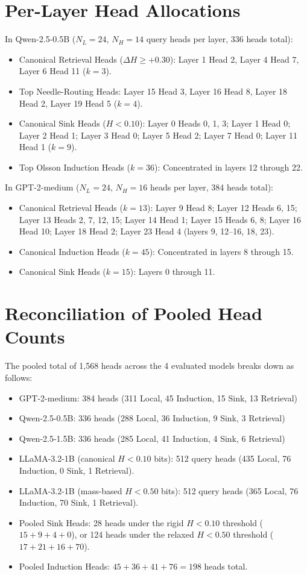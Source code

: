\documentclass[11pt]{article}
\begin{document}
\section{Per-Layer Head Allocations}
\label{sec:app_heads}
In Qwen-2.5-0.5B ($N_L = 24$, $N_H = 14$ query heads per layer, 336 heads total):
\begin{itemize}
    \setlength{\itemsep}{1pt}
    \item Canonical Retrieval Heads ($\Delta H \ge +0.30$): Layer 1 Head 2, Layer 4 Head 7, Layer 6 Head 11 ($k=3$).
    \item Top Needle-Routing Heads: Layer 15 Head 3, Layer 16 Head 8, Layer 18 Head 2, Layer 19 Head 5 ($k=4$).
    \item Canonical Sink Heads ($H < 0.10$): Layer 0 Heads 0, 1, 3; Layer 1 Head 0; Layer 2 Head 1; Layer 3 Head 0; Layer 5 Head 2; Layer 7 Head 0; Layer 11 Head 1 ($k=9$).
    \item Top Olsson Induction Heads ($k=36$): Concentrated in layers 12 through 22.
\end{itemize}
In GPT-2-medium ($N_L = 24$, $N_H = 16$ heads per layer, 384 heads total):
\begin{itemize}
    \setlength{\itemsep}{1pt}
    \item Canonical Retrieval Heads ($k=13$): Layer 9 Head 8; Layer 12 Heads 6, 15; Layer 13 Heads 2, 7, 12, 15; Layer 14 Head 1; Layer 15 Heads 6, 8; Layer 16 Head 10; Layer 18 Head 2; Layer 23 Head 4 (layers 9, 12--16, 18, 23).
    \item Canonical Induction Heads ($k=45$): Concentrated in layers 8 through 15.
    \item Canonical Sink Heads ($k=15$): Layers 0 through 11.
\end{itemize}

\section{Reconciliation of Pooled Head Counts}
\label{sec:app_counts}
The pooled total of 1,568 heads across the 4 evaluated models breaks down as follows:
\begin{itemize}
    \setlength{\itemsep}{1pt}
    \item GPT-2-medium: 384 heads (311 Local, 45 Induction, 15 Sink, 13 Retrieval)
    \item Qwen-2.5-0.5B: 336 heads (288 Local, 36 Induction, 9 Sink, 3 Retrieval)
    \item Qwen-2.5-1.5B: 336 heads (285 Local, 41 Induction, 4 Sink, 6 Retrieval)
    \item LLaMA-3.2-1B (canonical $H < 0.10$ bits): 512 query heads (435 Local, 76 Induction, 0 Sink, 1 Retrieval).
    \item LLaMA-3.2-1B (mass-based $H < 0.50$ bits): 512 query heads (365 Local, 76 Induction, 70 Sink, 1 Retrieval).
    \item Pooled Sink Heads: 28 heads under the rigid $H < 0.10$ threshold ($15 + 9 + 4 + 0$), or 124 heads under the relaxed $H < 0.50$ threshold ($17 + 21 + 16 + 70$).
    \item Pooled Induction Heads: $45 + 36 + 41 + 76 = 198$ heads total.
\end{itemize}
\end{document}
